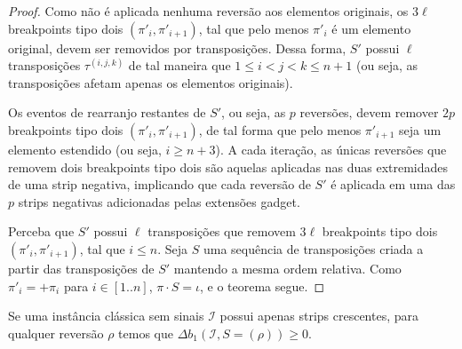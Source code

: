 \begin{proof}
Como não é aplicada nenhuma reversão aos elementos originais, os $3\ell$ breakpoints tipo dois $(\pi'_i,\pi'_{i+1})$, tal que pelo menos $\pi'_i$ é um elemento original, devem ser removidos por transposições. Dessa forma, $S'$ possui $\ell$ transposições $\tau^{(i,j,k)}$ de tal maneira que $1 \le i < j < k \le n+1$ (ou seja, as transposições afetam apenas os elementos originais). 

Os eventos de rearranjo restantes de $S'$, ou seja, as $p$ reversões, devem remover $2p$ breakpoints tipo dois $(\pi'_i,\pi'_{i+1})$, de tal forma que pelo menos $\pi'_{i+1}$ seja um elemento estendido (ou seja, $i \ge n+3$). A cada iteração, as únicas reversões que removem dois breakpoints tipo dois são aquelas aplicadas nas duas extremidades de uma strip negativa, implicando que cada reversão de $S'$ é aplicada em uma das $p$ strips negativas adicionadas pelas extensões gadget.

Perceba que $S'$ possui $\ell$ transposições que removem $3\ell$ breakpoints tipo dois $(\pi'_i,\pi'_{i+1})$, tal que $i \le n$. Seja $S$ uma sequência de transposições criada a partir das transposições de $S'$ mantendo a mesma ordem relativa. Como $\pi'_i = +\pi_i$ para $i \in [1..n]$, $\pi \cdot S = \iota$, e o teorema segue.
\end{proof}



\begin{lemma}\label{lemma:PXXMRMWO}
Se uma instância clássica sem sinais $\mathcal{I}$ possui apenas strips crescentes, para qualquer reversão $\rho$ temos que $\Delta b_1(\mathcal{I}, S=(\rho)) \ge 0$.
\end{lemma}

